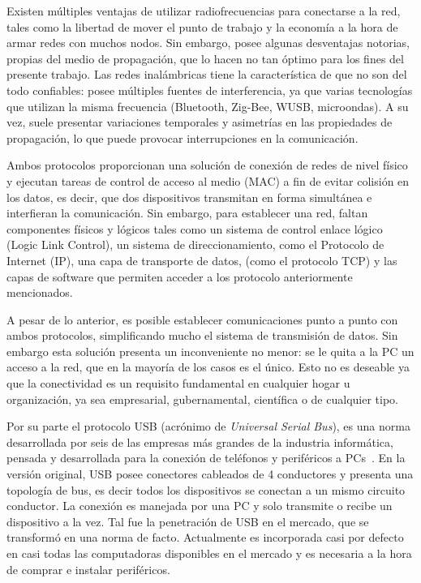 Existen múltiples ventajas de utilizar radiofrecuencias para conectarse a la red, tales como la libertad de mover el punto de trabajo y la economía a la hora de armar redes con muchos nodos. Sin embargo, posee algunas desventajas notorias, propias del medio de propagación, que lo hacen no tan óptimo para los fines del presente trabajo. Las redes inalámbricas tiene la característica de que no son del todo confiables: posee múltiples fuentes de interferencia, ya que varias tecnologías que utilizan la misma frecuencia (Bluetooth, Zig-Bee, WUSB, microondas). A su vez, suele presentar variaciones temporales y asimetrías en las propiedades de propagación, lo que puede provocar interrupciones en la comunicación.%

Ambos protocolos proporcionan una solución de conexión de redes de nivel físico y ejecutan tareas de control de acceso al medio (MAC) a fin de evitar colisión en los datos, es decir, que dos dispositivos transmitan en forma simultánea e interfieran la comunicación.
Sin embargo, para establecer una red, faltan componentes físicos y lógicos tales como un sistema de control enlace lógico (Logic Link Control), un sistema de direccionamiento, como el Protocolo de Internet (IP), una capa de transporte de datos, (como el protocolo TCP) y las capas de software que permiten acceder a los protocolo anteriormente mencionados.%

A pesar de lo anterior, es posible establecer comunicaciones punto a punto con ambos protocolos, simplificando mucho el sistema de transmisión de datos. Sin embargo esta solución presenta un inconveniente no menor: se le quita a la PC un acceso a la red, que en la mayoría de los casos es el único. Esto no es deseable ya que la conectividad es un requisito fundamental en cualquier hogar u organización, ya sea empresarial, gubernamental, científica o de cualquier tipo.%

Por su parte el protocolo USB (acrónimo de {\it Universal Serial Bus}), es una norma desarrollada por seis de las empresas más grandes de la industria informática, pensada y desarrollada para la conexión de teléfonos y periféricos a PCs~\cite{USBspec}. En la versión original, USB posee conectores cableados de 4 conductores y presenta una topología de bus, es decir todos los dispositivos se conectan a un mismo circuito conductor. La conexión es manejada por una PC y solo transmite o recibe un dispositivo a la vez. Tal fue la penetración de USB en el mercado, que se transformó en una norma de facto. Actualmente es incorporada casi por defecto en casi todas las computadoras disponibles en el mercado y es necesaria a la hora de comprar e instalar periféricos.%

